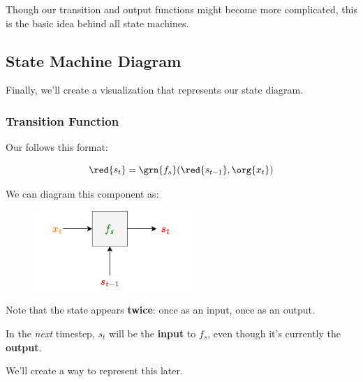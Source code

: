             Though our transition and output functions might become more complicated, this is the basic idea behind all state machines.
    
    \secdiv 
    
    \subsection{State Machine Diagram}
    
        Finally, we'll create a visualization that represents our state diagram.
        
        \subsubsection{Transition Function}
        
            Our  follows this format:
            
            \begin{equation}
                \red{s_t} = 
                \grn{f_s}(\red{s_{t-1}}, \org{x_t})
            \end{equation}
            
            We can diagram this component as:
            
            \begin{figure}[H]
                \centering
                \includegraphics[width=60mm,scale=0.4]{images/rnn_images/transition_diagram.png}
            \end{figure}
            
            Note that the state appears \textbf{twice}: once as an input, once as an output.
            
            In the \textit{next} timestep, $s_t$ will be the \textbf{input} to $f_s$, even though it's currently the \textbf{output}.
                
            We'll create a way to represent this later.
        
        \subsecdiv
        
